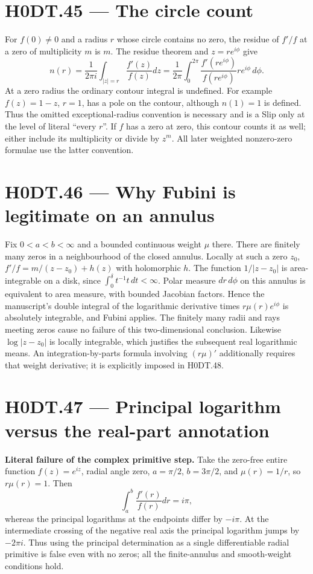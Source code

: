 \section*{H0DT.45 --- The circle count}
For $f(0)\ne0$ and a radius $r$ whose circle contains no zero, the residue of $f'/f$ at a zero of multiplicity $m$ is $m$. The residue theorem and $z=re^{i\phi}$ give
\[
 n(r)=\frac1{2\pi i}\int_{|z|=r}\frac{f'(z)}{f(z)}dz
 =\frac1{2\pi}\int_0^{2\pi}\frac{f'(re^{i\phi})}{f(re^{i\phi})}re^{i\phi}\,d\phi.
\]
At a zero radius the ordinary contour integral is undefined. For example $f(z)=1-z$, $r=1$, has a pole on the contour, although $n(1)=1$ is defined. Thus the omitted exceptional-radius convention is necessary and is a Slip only at the level of literal ``every $r$''. If $f$ has a zero at zero, this contour counts it as well; either include its multiplicity or divide by $z^m$. All later weighted nonzero-zero formulae use the latter convention.

\section*{H0DT.46 --- Why Fubini is legitimate on an annulus}
Fix $0<a<b<\infty$ and a bounded continuous weight $\mu$ there. There are finitely many zeros in a neighbourhood of the closed annulus. Locally at such a zero $z_0$, $f'/f=m/(z-z_0)+h(z)$ with holomorphic $h$. The function $1/|z-z_0|$ is area-integrable on a disk, since $\int_0^\delta t^{-1}t\,dt<\infty$. Polar measure $dr\,d\phi$ on this annulus is equivalent to area measure, with bounded Jacobian factors. Hence the manuscript's double integral of the logarithmic derivative times $r\mu(r)e^{i\phi}$ is absolutely integrable, and Fubini applies. The finitely many radii and rays meeting zeros cause no failure of this two-dimensional conclusion. Likewise $\log|z-z_0|$ is locally integrable, which justifies the subsequent real logarithmic means. An integration-by-parts formula involving $(r\mu)'$ additionally requires that weight derivative; it is explicitly imposed in H0DT.48.

\section*{H0DT.47 --- Principal logarithm versus the real-part annotation}
\textbf{Literal failure of the complex primitive step.} Take the zero-free entire function $f(z)=e^{iz}$, radial angle zero, $a=\pi/2$, $b=3\pi/2$, and $\mu(r)=1/r$, so $r\mu(r)=1$. Then
\[
 \int_a^b\frac{f'(r)}{f(r)}dr=i\pi,
\]
whereas the principal logarithms at the endpoints differ by $-i\pi$. At the intermediate crossing of the negative real axis the principal logarithm jumps by $-2\pi i$. Thus using the principal determination as a single differentiable radial primitive is false even with no zeros; all the finite-annulus and smooth-weight conditions hold.

